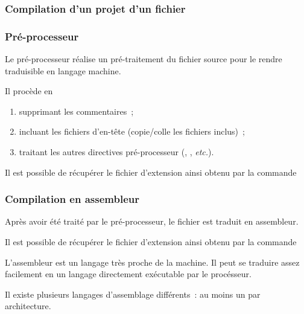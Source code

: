 \begin{frame}[fragile]
\frametitle{Compilation d'un projet d'un fichier}
\begin{center}
\end{center}
\end{frame}

\begin{frame}[fragile]
\frametitle{Pré-processeur}
Le \alert{pré-processeur} réalise un pré-traitement du fichier source
pour le rendre traduisible en langage machine.
\medskip

Il procède en
\begin{enumerate}
    \item supprimant les commentaires~;
    \smallskip

    \item incluant les fichiers d'en-tête
    (copie/colle les fichiers  inclus)~;
    \smallskip

    \item traitant les autres directives pré-processeur
    (, , {\em etc.}).
\end{enumerate}
\medskip

Il est possible de récupérer le fichier d'extension  ainsi
obtenu par la commande
\begin{center}  \end{center}
\end{frame}

\begin{frame}[fragile]
\frametitle{Compilation en assembleur}
Après avoir été traité par le pré-processeur, le fichier 
est \alert{traduit en assembleur}.
\medskip

Il est possible de récupérer le fichier d'extension  ainsi
obtenu par la commande
\begin{center}  \end{center}
\bigskip

L'assembleur est un langage très proche de la machine. Il peut se traduire
assez facilement en un langage directement exécutable par le procésseur.
\medskip

Il existe plusieurs langages d'assemblage différents~: au moins un par
architecture.
\end{frame}

